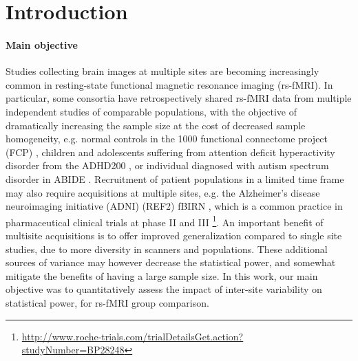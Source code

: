 \documentclass[authoryear]{elsarticle}
\begin{document}
\section{Introduction}

\paragraph{Main objective}
Studies collecting brain images at multiple sites are becoming increasingly common in resting-state functional magnetic resonance imaging (rs-fMRI). In particular, some consortia have retrospectively shared rs-fMRI data from multiple independent studies of comparable populations, with the objective of dramatically increasing the sample size at the cost of decreased sample homogeneity, e.g. normal controls in the 1000 functional connectome project (FCP) \citep{Biswal2010}, children and adolescents suffering from attention deficit hyperactivity disorder from the ADHD200 \citep{ADHD200,Fair2012}, or individual diagnosed with autism spectrum disorder in ABIDE \citep{Nielsen2013}. Recruitment of patient populations in a limited time frame may also require acquisitions at multiple sites, e.g. the Alzheimer’s disease neuroimaging initiative (ADNI) \citep{Mueller2005} (REF2) fBIRN \citep{Friedman2006,Friedman2006a}, which is a common practice in pharmaceutical clinical trials at phase II and III \footnote{\url{http://www.roche-trials.com/trialDetailsGet.action?studyNumber=BP28248}}. An important benefit of multisite acquisitions is to offer improved generalization compared to single site studies, due to more diversity in scanners and populations. These additional sources of variance may however decrease the statistical power, and somewhat mitigate the benefits of having a large sample size. In this work, our main objective was to quantitatively assess the impact of inter-site variability on statistical power, for rs-fMRI group comparison.
\end{document}
